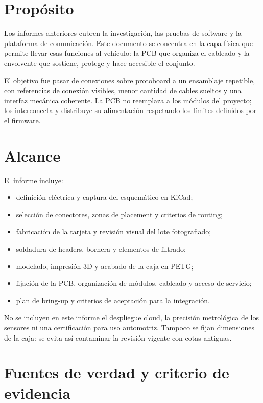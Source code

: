 \documentclass[11pt,a4paper,oneside]{report}
\begin{document}
\section{Propósito}

Los informes anteriores cubren la investigación, las pruebas de software y la
plataforma de comunicación. Este documento se concentra en la capa física que
permite llevar esas funciones al vehículo: la PCB que organiza el cableado y la
envolvente que sostiene, protege y hace accesible el conjunto.

El objetivo fue pasar de conexiones sobre protoboard a un ensamblaje repetible,
con referencias de conexión visibles, menor cantidad de cables sueltos y una
interfaz mecánica coherente. La PCB no reemplaza a los módulos del proyecto; los
interconecta y distribuye su alimentación respetando los límites definidos por el
firmware.

\section{Alcance}

El informe incluye:

\begin{itemize}
  \item definición eléctrica y captura del esquemático en KiCad;
  \item selección de conectores, zonas de placement y criterios de routing;
  \item fabricación de la tarjeta y revisión visual del lote fotografiado;
  \item soldadura de headers, bornera y elementos de filtrado;
  \item modelado, impresión 3D y acabado de la caja en PETG;
  \item fijación de la PCB, organización de módulos, cableado y acceso de servicio;
  \item plan de bring-up y criterios de aceptación para la integración.
\end{itemize}

No se incluyen en este informe el despliegue cloud, la precisión metrológica de los
sensores ni una certificación para uso automotriz. Tampoco se fijan dimensiones de
la caja: se evita así contaminar la revisión vigente con cotas antiguas.

\section{Fuentes de verdad y criterio de evidencia}
\end{document}

